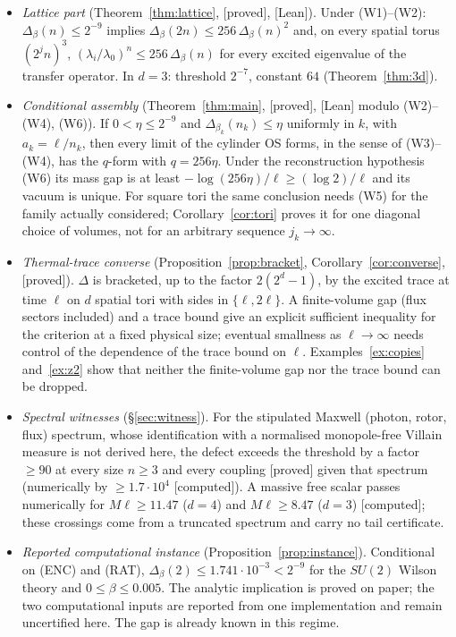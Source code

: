 \documentclass[11pt,a4paper]{article}
\theoremstyle{plain}
\theoremstyle{definition}
\theoremstyle{remark}
\numberwithin{equation}{section}
\newcommand{\st}[1]{\textsf{[#1]}}
\begin{document}
\begin{itemize}
\item \emph{Lattice part} (Theorem~\ref{thm:lattice}, \st{proved}, \st{Lean}). Under (W1)--(W2): $\Delta_\beta(n)\le2^{-9}$ implies
$\Delta_\beta(2n)\le256\,\Delta_\beta(n)^2$ and, on every spatial torus $(2^jn)^3$, $(\lambda_i/\lambda_0)^n\le256\,\Delta_\beta(n)$ for
every excited eigenvalue of the transfer operator. In $d=3$: threshold $2^{-7}$, constant $64$ (Theorem~\ref{thm:3d}).
\item \emph{Conditional assembly} (Theorem~\ref{thm:main}, \st{proved}, \st{Lean} modulo (W2)--(W4), (W6)). If $0<\eta\le2^{-9}$ and
$\Delta_{\beta_k}(n_k)\le\eta$ uniformly in $k$, with $a_k=\ell/n_k$, then every limit of the cylinder OS forms, in the sense of (W3)--(W4), has
the $q$-form with $q=256\eta$. Under the reconstruction hypothesis (W6) its mass gap is at least $-\log(256\eta)/\ell\ge(\log2)/\ell$ and its
vacuum is unique. For square tori the same conclusion needs (W5) for the family actually considered; Corollary~\ref{cor:tori} proves it for one
diagonal choice of volumes, not for an arbitrary sequence $j_k\to\infty$.
\item \emph{Thermal-trace converse} (Proposition~\ref{prop:bracket}, Corollary~\ref{cor:converse}, \st{proved}). $\Delta$ is bracketed,
up to the factor $2(2^d-1)$, by the excited trace at time $\ell$ on $d$ spatial tori with sides in $\{\ell,2\ell\}$. A finite-volume gap
(flux sectors included) and a trace bound give an explicit sufficient inequality for the criterion at a fixed physical size; eventual
smallness as $\ell\to\infty$ needs control of the dependence of the trace bound on $\ell$. Examples~\ref{ex:copies} and~\ref{ex:z2} show that
neither the finite-volume gap nor the trace bound can be dropped.
\item \emph{Spectral witnesses} (\S\ref{sec:witness}). For the stipulated Maxwell (photon, rotor, flux) spectrum, whose identification
with a normalised monopole-free Villain measure is not derived here, the defect exceeds the threshold by a factor $\ge90$ at every size $n\ge3$
and every coupling \st{proved} given that spectrum (numerically by $\ge1.7\cdot10^4$ \st{computed}). A massive free scalar passes numerically
for $M\ell\ge11.47$ ($d=4$) and $M\ell\ge8.47$ ($d=3$) \st{computed}; these crossings come from a truncated spectrum and carry no tail
certificate.
\item \emph{Reported computational instance} (Proposition~\ref{prop:instance}). Conditional on (ENC) and (RAT), $\Delta_\beta(2)\le1.741\cdot10^{-3}<2^{-9}$ for the $SU(2)$ Wilson theory and $0\le\beta\le0.005$. The analytic implication is proved on paper; the two computational inputs are reported from one implementation and remain uncertified here. The gap is already known in this regime.
\end{itemize}
\end{document}
